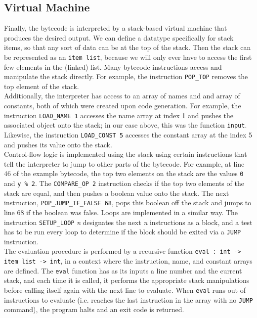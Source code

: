 \documentclass[11pt, twoside]{article}
\begin{document}
    \subsection{Virtual Machine}
    Finally, the bytecode is interpreted by a stack-based virtual machine that produces the desired output. We can define a datatype specifically for stack items, so that any sort of data can be at the top of the stack. Then the stack can be represented as an \texttt{item list}, because we will only ever have to access the first few elements in the (linked) list. Many bytecode instructions access and manipulate the stack directly. For example, the instruction \texttt{POP\_TOP} removes the top element of the stack.\\
    \indent Additionally, the interpreter has access to an array of names and and array of constants, both of which were created upon code generation. For example, the instruction \texttt{LOAD\_NAME 1} accesses the name array at index 1 and pushes the associated object onto the stack; in our case above, this was the function \texttt{input}. Likewise, the instruction \texttt{LOAD\_CONST 5} accesses the constant array at the index 5 and pushes its value onto the stack.\\
    \indent Control-flow logic is implemented using the stack using certain instructions that tell the interpreter to jump to other parts of the bytecode. For example, at line 46 of the example bytecode, the top two elements on the stack are the values \texttt{0} and \texttt{y \% 2}. The \texttt{COMPARE\_OP 2} instruction checks if the top two elements of the stack are equal, and then pushes a boolean value onto the stack. The next instruction, \texttt{POP\_JUMP\_IF\_FALSE 68}, pops this boolean off the stack and jumps to line 68 if the boolean was false. Loops are implemented in a similar way. The instruction \texttt{SETUP\_LOOP} \textit{n} designates the next \textit{n} instructions as a block, and a test has to be run every loop to determine if the block should be exited via a \texttt{JUMP} instruction.\\
    \indent The evaluation procedure is performed by a recursive function \texttt{eval : int -> item list -> int}, in a context where the instruction, name, and constant arrays are defined. The \texttt{eval} function has as its inputs a line number and the current stack, and each time it is called, it performs the appropriate stack manipulations before calling itself again with the next line to evaluate. When \texttt{eval} runs out of instructions to evaluate (i.e. reaches the last instruction in the array with no \texttt{JUMP} command), the program halts and an exit code is returned.
\end{document}
